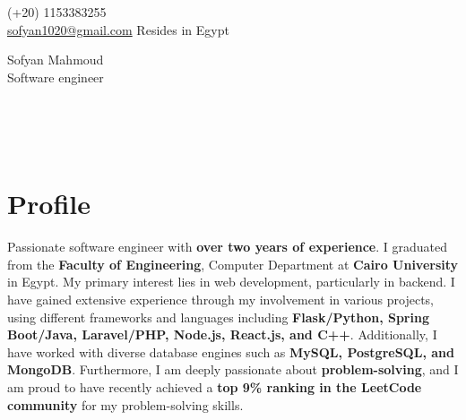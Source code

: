 \documentclass[a4,10pt]{article}
\begin{document}
\begin{center}
    \begin{minipage}[b]{0.24\textwidth}
            \large (+20) 1153383255 \\
            \large \href{mailto:sofyan1020@gmail.com}{sofyan1020@gmail.com} 
            \large Resides in Egypt
    \end{minipage}%
    \begin{minipage}[b]{0.5\textwidth}
            \centering
            {\Huge Sofyan Mahmoud} \\ %
            \vspace{0.1cm}
            {\color{UI_blue} \Large{Software engineer}} \\
    \end{minipage}%
    \begin{minipage}[b]{0.24\textwidth}
            \flushright \large  %
            \href{https://www.linkedin.com/in/sofyanmahmoud0000/}{\color{blue}{LinkedIn} } \\
            \href{https://leetcode.com/u/sofyan1020/}{\color{blue}{Leetcode}} \\ 
            \href{https://github.com/sofyanmahmoud0000}{\color{blue}{Github}} \\ 
    \end{minipage}   
    
\vspace{-0.15cm} 
\end{center}
\vspace{-0.25cm}

\section{Profile }
Passionate software engineer with \textbf{over two years of experience}. I graduated from the \textbf{Faculty of Engineering}, 
Computer Department at \textbf{Cairo University} in Egypt. My primary interest lies in web development, 
particularly in backend. I have gained extensive experience through my involvement in various projects, 
using different frameworks and languages including \textbf{Flask/Python, Spring Boot/Java, 
Laravel/PHP, Node.js, React.js, and C++}. Additionally, I have worked with diverse database engines such as \textbf{MySQL, 
PostgreSQL, and MongoDB}. Furthermore, I am deeply passionate about \textbf{problem-solving}, 
and I am proud to have recently achieved a \textbf{top 9\% ranking in the LeetCode community} for my problem-solving skills. \\
\end{document}
